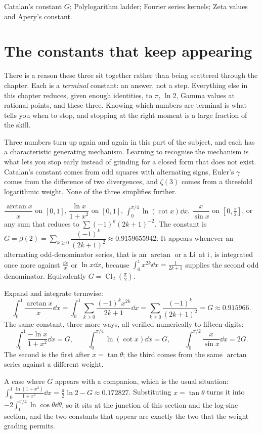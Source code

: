 \begin{seealsob}Catalan's constant $G$; Polylogarithm ladder; Fourier series kernels; Zeta values and Apery's constant.\end{seealsob}

\section{The constants that keep appearing}

There is a reason these three sit together rather than being scattered through the chapter. Each is a \emph{terminal} constant: an answer, not a step. Everything else in this chapter reduces, given enough identities, to $\pi$, $\ln2$, Gamma values at rational points, and these three. Knowing which numbers are terminal is what tells you when to stop, and stopping at the right moment is a large fraction of the skill.

Three numbers turn up again and again in this part of the subject, and each has a characteristic generating mechanism. Learning to recognise the mechanism is what lets you stop early instead of grinding for a closed form that does not exist. Catalan's constant comes from odd squares with alternating signs, Euler's $\gamma$ comes from the difference of two divergences, and $\zeta(3)$ comes from a threefold logarithmic weight. None of the three simplifies further.

\cue $\dfrac{\arctan x}{x}$ on $[0,1]$, $\dfrac{\ln x}{1+x^{2}}$ on $[0,1]$, $\int_0^{\pi/4}\ln(\cot x)\dd x$, $\dfrac{x}{\sin x}$ on $[0,\tfrac\pi2]$, or any sum that reduces to $\sum(-1)^{k}(2k+1)^{-2}$.
\method The constant is $G=\beta(2)=\sum_{k\geq0}\dfrac{(-1)^{k}}{(2k+1)^{2}}\approx0.9159655942$. It appears whenever an alternating odd-denominator series, that is an $\arctan$ or a $\operatorname{Li}$ at $\mathrm{i}$, is integrated once more against $\tfrac{\dd x}{x}$ or $\ln x\dd x$, because $\int_0^1x^{2k}\dd x=\tfrac{1}{2k+1}$ supplies the second odd denominator. Equivalently $G=\operatorname{Cl}_2(\tfrac{\pi}{2})$.

\begin{worked}
Expand and integrate termwise:
\[\int_0^1\frac{\arctan x}{x}\dd x=\int_0^1\sum_{k\geq0}\frac{(-1)^{k}x^{2k}}{2k+1}\dd x=\sum_{k\geq0}\frac{(-1)^{k}}{(2k+1)^{2}}=G\approx0.915966.\]
The same constant, three more ways, all verified numerically to fifteen digits:
\[\int_0^1\frac{-\ln x}{1+x^{2}}\dd x=G,\qquad \int_0^{\pi/4}\ln(\cot x)\dd x=G,\qquad \int_0^{\pi/2}\frac{x}{\sin x}\dd x=2G.\]
The second is the first after $x=\tan\theta$; the third comes from the same $\arctan$ series against a different weight.

A case where $G$ appears with a companion, which is the usual situation: $\int_0^1\frac{\ln(1+x^{2})}{1+x^{2}}\dd x=\frac{\pi}{2}\ln2-G\approx0.172827$. Substituting $x=\tan\theta$ turns it into $-2\int_0^{\pi/4}\ln\cos\theta\dd\theta$, so it sits at the junction of this section and the log-sine section, and the two constants that appear are exactly the two that the weight grading permits.
\end{worked}


